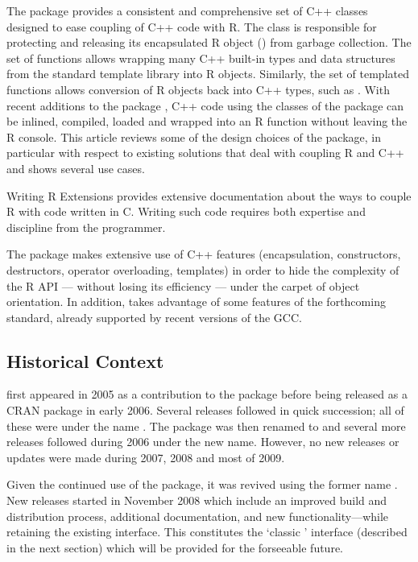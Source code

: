 The  package provides a consistent and comprehensive set 
of C++ classes designed to ease coupling of C++ code
with R. The  class is responsible for 
protecting and releasing its encapsulated R object ()
from garbage collection. The  set of functions allows
wrapping many C++ built-in types and data structures from the standard
template library into R objects. Similarly, the  set of 
templated functions allows conversion of R objects back into C++
types, such as . With recent additions to the 
 package \citep{cran:inline}, 
C++ code using the classes of the 
 package can be inlined, compiled, loaded and wrapped 
into an R function without leaving the R console. 
This article reviews some of the design choices of the
 package, in particular with respect to existing solutions
that deal with coupling R and C++ and shows several use cases.

Writing R Extensions \citep{R:exts} provides extensive 
documentation about the ways to couple R with code written in C. 
Writing such code requires both expertise and discipline from the 
programmer.

The  package makes extensive use of C++ features (encapsulation, 
constructors, destructors, operator overloading, templates) in order
to hide the complexity of the R API --- without losing its 
efficiency --- under the carpet of object orientation. In addition, 
 takes advantage of some features of the forthcoming  
standard, already supported by recent versions of the GCC.

\subsection{Historical Context}

 first appeared in 2005 as a contribution to the 
package \citep{eddelbuettelkhan09:rquantlib} before being released as a CRAN
package in early 2006. Several releases followed in quick succession; all of
these were under the name . The package was then renamed to
 and several more releases followed during 2006 under the
new name.  However, no new releases or updates were made during 2007, 2008
and most of 2009.

Given the continued use of the package, it was revived using the former name
. New releases started in November 2008 which include an improved
build and distribution process, additional documentation, and new
functionality---while retaining the existing interface.  This constitutes the
`classic ' interface (described in the next section)
which will be provided for the forseeable future.

